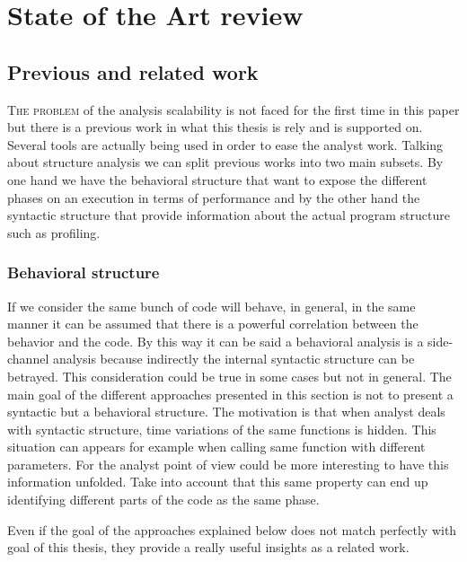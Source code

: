 \chapter{State of the Art review}

\section{Previous and related work}\label{related_work}

\lettrine{T}{he problem} of the analysis scalability is not faced for the first time in 
this paper but there is a previous work in what this thesis is rely and is 
supported on. Several tools are actually being used in order to ease the analyst
work. Talking about structure analysis we can split previous works into two main
subsets. By one hand we have the behavioral structure that want to expose the
different phases on an execution in terms of performance and by the other hand
the syntactic structure that provide information about the actual program
structure such as profiling.

\subsection{Behavioral structure}

If we consider the same bunch of code will behave, in general, in the same
manner it can be assumed that there is a powerful correlation between the
behavior and the code. By this way it can be said a behavioral analysis is a
side-channel analysis because indirectly the internal syntactic structure can be
betrayed. This consideration could be true in some cases but not in general. The 
main goal of the different approaches presented in this section is not
to present a syntactic but a behavioral structure. The motivation is that when
analyst deals with syntactic structure, time variations of the same functions is
hidden. This situation can appears for example when calling same function with
different parameters. For the analyst point of view could be more interesting to
have this information unfolded. Take into account that this same property can
end up identifying different parts of the code as the same phase.

Even if the goal of the approaches explained below does not match perfectly with
goal of this thesis, they provide a really useful insights as a related work.

